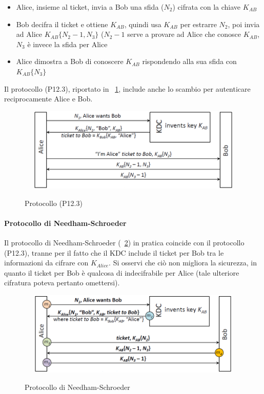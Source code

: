 \begin{itemize}
	\item Alice, insieme al ticket, invia a Bob una sfida ($N_{2}$) cifrata con la chiave $K_{AB}$
	\item Bob decifra il ticket e ottiene $K_{AB}$, quindi usa $K_{AB}$ per estrarre $N_{2}$, poi invia ad Alice $K_{AB}\lbrace N_{2}-1, N_{3}\rbrace$ ($N_{2}-1$ serve a provare ad Alice che conosce $K_{AB}$, $N_{3}$ è invece la sfida per Alice
	\item Alice dimostra a Bob di conoscere $K_{AB}$ rispondendo alla sua sfida con $K_{AB}\lbrace N_{3}\rbrace$
\end{itemize}
Il protocollo (P12.3), riportato in \figurename~\ref{fig:ImgS109bis}, include anche lo scambio per autenticare reciprocamente Alice e Bob.
\begin{figure}[htbp]
	\centering%
	\subfigure%
	{\includegraphics[height=4cm, width=12cm, keepaspectratio]{Immagini/autenticazione/ImgS109bis.png}}
	\caption{Protocollo (P12.3)}\label{fig:ImgS109bis} 	
\end{figure}
\paragraph{Protocollo di Needham-Schroeder}
Il protocollo di Needham-Schroeder (\figurename~\ref{fig:ImgS111bis}) in pratica coincide con il protocollo (P12.3),  tranne per il fatto che il KDC include il ticket per Bob tra le informazioni da cifrare con $K_{Alice}$. Si osservi che ciò non migliora la sicurezza, in quanto il ticket per Bob è qualcosa di indecifrabile per Alice (tale ulteriore cifratura poteva pertanto omettersi).
\begin{figure}[htbp]
	\centering%
	\subfigure%
	{\includegraphics[height=4cm, width=12cm, keepaspectratio]{Immagini/autenticazione/ImgS111bis.png}}
	\caption{Protocollo di Needham-Schroeder}\label{fig:ImgS111bis} 	
\end{figure}

